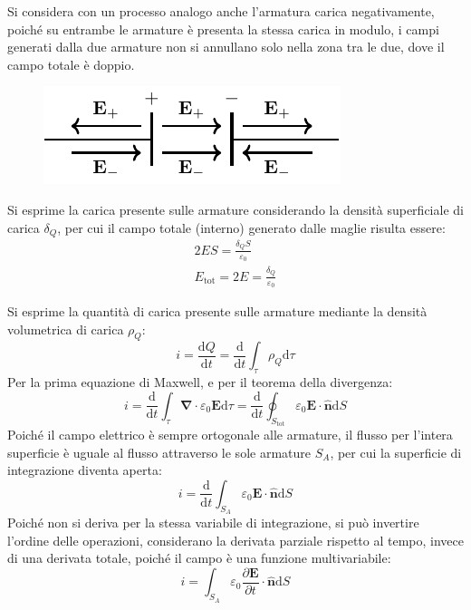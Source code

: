 \documentclass{article}
\newcommand{\vect}[1]{\boldsymbol{\mathbf{#1}}}
\newcommand{\df}{\mathrm{d}}
\numberwithin{equation}{subsection}
\begin{document}
Si considera con un processo analogo anche l'armatura carica negativamente, poiché su entrambe le armature è presenta la stessa carica in modulo, i campi generati dalla due 
armature non si annullano solo nella zona tra le due, dove il campo totale è doppio. 
\begin{figure}[H]%
    \centering
    \includegraphics{campo-elettrico-filo-reciso.pdf}%
    \label{fig:campo-elettrico-filo-reciso}
\end{figure}

Si esprime la carica presente sulle armature considerando la densità superficiale di carica $\delta_Q$, per cui il campo totale (interno) generato dalle maglie risulta essere:
\begin{gather*}
    2ES=\displaystyle\frac{\delta_QS}{\varepsilon_0}\\
    E_\mathrm{tot}=2E=\displaystyle\frac{\delta_Q}{\varepsilon_0}
\end{gather*}


Si esprime la quantità di carica presente sulle armature mediante la densità volumetrica di carica $\rho_Q$:
\begin{equation*}
    i=\displaystyle\frac{\df Q}{\df t}=\frac{\df}{\df t}\int_{\tau}\rho_Q\df\tau
\end{equation*}
Per la prima equazione di Maxwell, e per il teorema della divergenza: 
\begin{equation*}
    i=\displaystyle\frac{\df}{\df t}\int_{\tau}\vect\nabla\cdot\varepsilon_0\vect{E}\df\tau=\frac{\df}{\df t}\oint_{S_\mathrm{tot}}\varepsilon_0\vect{E}\cdot\hat{\vect{n}}\df S
\end{equation*}
Poiché il campo elettrico è sempre ortogonale alle armature, il flusso per l'intera superficie è uguale al flusso attraverso le sole armature $S_A$, per cui la superficie 
di integrazione diventa aperta:
\begin{equation*}
    i=\displaystyle\frac{\df}{\df t}\int_{S_A}\varepsilon_0\vect{E}\cdot\hat{\vect{n}}\df S
\end{equation*}
Poiché non si deriva per la stessa variabile di integrazione, si può invertire l'ordine delle operazioni, considerano la derivata parziale rispetto al tempo, invece di una 
derivata totale, poiché il campo è una funzione multivariabile:
\begin{equation*}
    i=\displaystyle\int_{S_A}\varepsilon_0\frac{\partial \vect{E}}{\partial t}\cdot\hat{\vect{n}}\df S
\end{equation*}
\end{document}
